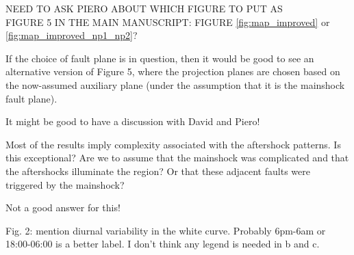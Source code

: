 \documentclass[10pt]{extarticle}
\begin{document}
{\LARGE \noindent NEED TO ASK PIERO ABOUT WHICH FIGURE TO PUT AS \\ FIGURE 5 IN THE MAIN MANUSCRIPT: FIGURE \ref{fig:map_improved} or \ref{fig:map_improved_np1_np2}?} \\

\begin{ReviewerComment}{1}
\noindent 
If the choice of fault plane is in question, then it would be good to see an alternative version of Figure 5, where the projection planes are chosen based on the now-assumed auxiliary plane (under the assumption that it is the mainshock fault plane).

\end{ReviewerComment}


\begin{Answer}
{\LARGE It might be good to have a discussion with David and Piero!}
 \WorkInProgressRevTask
\end{Answer}
%
%


\begin{ReviewerComment}{1}
\noindent 
Most of the results imply complexity associated with the aftershock patterns. Is this exceptional? Are we to assume that the mainshock was complicated and that the aftershocks illuminate the region? Or that these adjacent faults were triggered by the mainshock?

\end{ReviewerComment}


\begin{Answer}
{\LARGE Not a good answer for this!}
 \WorkInProgressRevTask
\end{Answer}
%
%




\begin{ReviewerComment}{1}
\noindent 
Fig. 2: mention diurnal variability in the white curve. Probably 6pm-6am or 18:00-06:00 is a better label. I don't think any legend is needed in b and c.

\end{ReviewerComment}
\end{document}
